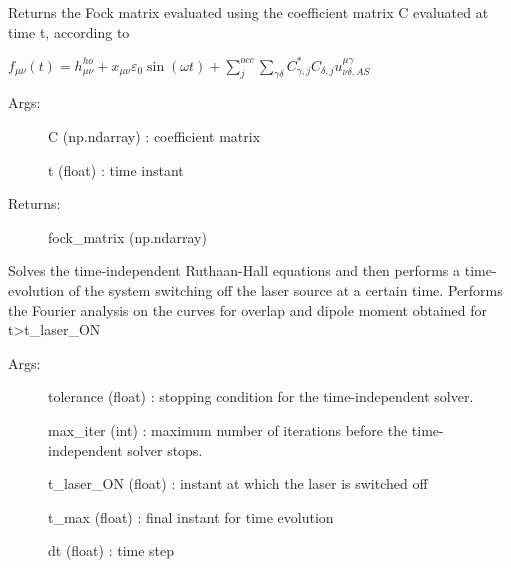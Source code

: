 \documentclass[letterpaper,10pt,english]{sphinxmanual}
\begin{document}
\begin{fulllineitems}

\begin{fulllineitems}
\label{\detokenize{index:do.GHF.fill_fock_matrix}}
Returns the Fock matrix evaluated using the coefficient matrix C evaluated at time t, according to

\(f_{\mu\nu}(t) =  h_{\mu\nu}^{ho} + x_{\mu\nu} \varepsilon_0 \sin(\omega t) + \sum_{j}^{occ} \sum_{\gamma\delta} C_{\gamma,j}^* C_{\delta,j} u^{\mu\gamma}_{\nu\delta,AS}\)
\begin{description}
\item[{Args:}] \leavevmode
C (np.ndarray) : coefficient matrix

t (float) : time instant

\item[{Returns:}] \leavevmode
fock\_matrix (np.ndarray)

\end{description}

\end{fulllineitems}


\begin{fulllineitems}
\label{\detokenize{index:do.GHF.fourier_analysis}}
Solves the time-independent Ruthaan-Hall equations and then performs a time-evolution of the system switching off the laser source at a certain time.
Performs the Fourier analysis on the curves for overlap and dipole moment obtained for t\textgreater{}t\_laser\_ON
\begin{description}
\item[{Args:}] \leavevmode
tolerance (float) : stopping condition for the time-independent solver.

max\_iter (int) : maximum number of iterations before the time-independent solver stops.

t\_laser\_ON (float) : instant at which the laser is switched off

t\_max (float) : final instant for time evolution

dt (float) : time step


\end{description}
\end{fulllineitems}
\end{fulllineitems}
\end{document}

